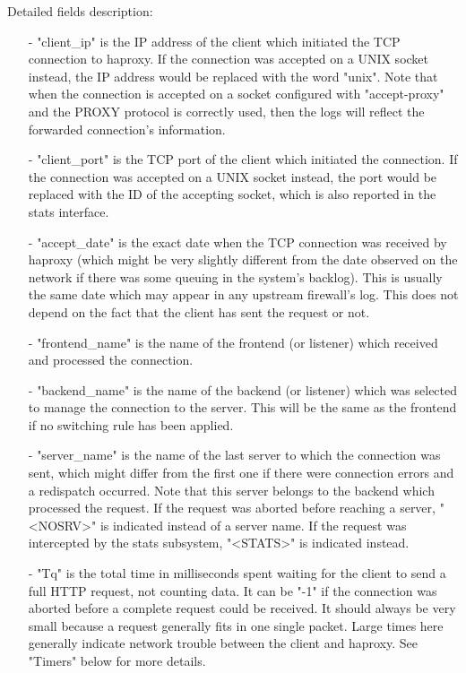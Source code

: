Detailed fields description:
\begin{itemize}
\item[-]
    "client\_ip" is the IP address of the client which initiated the TCP
    connection to haproxy. If the connection was accepted on a UNIX socket
    instead, the IP address would be replaced with the word "unix". Note that
    when the connection is accepted on a socket configured with "accept-proxy"
    and the PROXY protocol is correctly used, then the logs will reflect the
    forwarded connection's information.

\item[-]
    "client\_port" is the TCP port of the client which initiated the connection.
    If the connection was accepted on a UNIX socket instead, the port would be
    replaced with the ID of the accepting socket, which is also reported in the
    stats interface.

\item[-]
    "accept\_date" is the exact date when the TCP connection was received by
    haproxy (which might be very slightly different from the date observed on
    the network if there was some queuing in the system's backlog). This is
    usually the same date which may appear in any upstream firewall's log. This
    does not depend on the fact that the client has sent the request or not.

\item[-]
    "frontend\_name" is the name of the frontend (or listener) which received
    and processed the connection.

\item[-]
    "backend\_name" is the name of the backend (or listener) which was selected
    to manage the connection to the server. This will be the same as the
    frontend if no switching rule has been applied.

\item[-]
    "server\_name" is the name of the last server to which the connection was
    sent, which might differ from the first one if there were connection errors
    and a redispatch occurred. Note that this server belongs to the backend
    which processed the request. If the request was aborted before reaching a
    server, "<NOSRV>" is indicated instead of a server name. If the request was
    intercepted by the stats subsystem, "<STATS>" is indicated instead.

\item[-]
    "Tq" is the total time in milliseconds spent waiting for the client to send
    a full HTTP request, not counting data. It can be "-1" if the connection
    was aborted before a complete request could be received. It should always
    be very small because a request generally fits in one single packet. Large
    times here generally indicate network trouble between the client and
    haproxy. See "Timers" below for more details.


\end{itemize}
